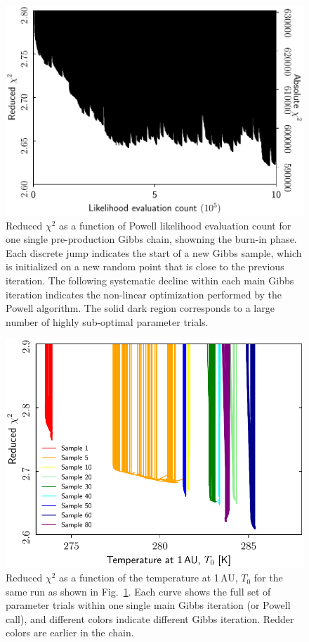 \documentclass[twocolumn]{aa}
\begin{document}
\begin{figure}[t]
    \centering
    \includegraphics[width=\linewidth]{figs/powell_red_chisq_vs_iter.pdf}
    \caption{Reduced $\chi^2$ as a function of Powell likelihood evaluation count for one single pre-production Gibbs chain, showning the burn-in phase. Each discrete jump indicates the start of a new Gibbs sample, which is initialized on a new random point that is close to the previous iteration. The following systematic decline within each main Gibbs iteration indicates the non-linear optimization performed by the Powell algorithm.  The solid dark region corresponds to a large number of highly sub-optimal parameter trials. }
    \label{fig:powell_chisq_iter}
\end{figure}




\begin{figure}[t]
    \centering
    \includegraphics[width=\linewidth]{figs/powell_T0_vs_chisq.pdf}
    \caption{Reduced $\chi^2$ as a function of the temperature at 1\,AU, $T_0$ for the same run as shown in Fig.~\ref{fig:powell_chisq_iter}. Each curve shows the full set of parameter trials within one single main Gibbs iteration (or Powell call), and different colors indicate different Gibbs iteration. Redder colors are earlier in the chain.}
    \label{fig:powell_T0}
\end{figure}
\end{document}
